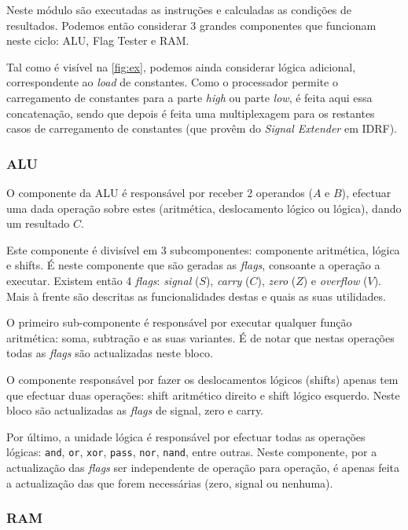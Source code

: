 \documentclass[a4paper]{article}
\begin{document}
			Neste módulo são executadas as instruções e calculadas as condições de resultados. Podemos então considerar 3 grandes componentes que funcionam neste ciclo: ALU, Flag Tester e RAM.

			Tal como é visível na \autoref{fig:ex}, podemos ainda considerar lógica adicional, correspondente ao \textit{load} de constantes. Como o processador permite o carregamento de constantes para a parte \textit{high} ou parte \textit{low}, é feita aqui essa concatenação, sendo que depois é feita uma multiplexagem para os restantes casos de carregamento de constantes (que provêm do \textit{Signal Extender} em IDRF).
		
			\subsubsection{ALU}
				
				O componente da ALU é responsável por receber 2 operandos ($A$ e $B$), efectuar uma dada operação sobre estes (aritmética, deslocamento lógico ou lógica), dando um resultado $C$.
				
				Este componente é divisível em 3 subcomponentes: componente aritmética, lógica e shifts. É neste componente que são geradas as \textit{flags}, consoante a operação a executar. Existem então 4 \textit{flags}: \textit{signal} ($S$), \textit{carry} ($C$), \textit{zero} ($Z$) e \textit{overflow} ($V$). Mais à frente são descritas as funcionalidades destas e quais as suas utilidades.
				
				O primeiro sub-componente é responsável por executar qualquer função aritmética: soma, subtração e as suas variantes. É de notar que nestas operações todas as \textit{flags} são actualizadas neste bloco.
				
				O componente responsável por fazer os deslocamentos lógicos (shifts) apenas tem que efectuar duas operações: shift aritmético direito e shift lógico esquerdo. Neste bloco são actualizadas as \textit{flags} de signal, zero e carry.
				
				Por último, a unidade lógica é responsável por efectuar todas as operações lógicas: \texttt{and}, \texttt{or}, \texttt{xor}, \texttt{pass}, \texttt{nor}, \texttt{nand}, entre outras. Neste componente, por a actualização das \textit{flags} ser independente de operação para operação, é apenas feita a actualização das que forem necessárias (zero, signal ou nenhuma).
			
			\subsubsection{RAM}
				
\end{document}
